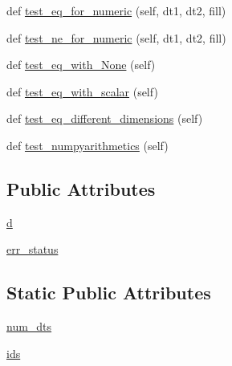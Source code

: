 \begin{DoxyCompactItemize}
\item 
def \hyperlink{classnumpy_1_1ma_1_1tests_1_1test__core_1_1TestMaskedArrayArithmetic_a850656e5b9b1ed7d491aa6cd62f332ad}{test\+\_\+eq\+\_\+for\+\_\+numeric} (self, dt1, dt2, fill)
\item 
def \hyperlink{classnumpy_1_1ma_1_1tests_1_1test__core_1_1TestMaskedArrayArithmetic_ad1511e126123782727d56780737859d2}{test\+\_\+ne\+\_\+for\+\_\+numeric} (self, dt1, dt2, fill)
\item 
def \hyperlink{classnumpy_1_1ma_1_1tests_1_1test__core_1_1TestMaskedArrayArithmetic_ab750537b060ed11b7270ede92b8f1d03}{test\+\_\+eq\+\_\+with\+\_\+\+None} (self)
\item 
def \hyperlink{classnumpy_1_1ma_1_1tests_1_1test__core_1_1TestMaskedArrayArithmetic_a2badcd153cb655e986bd8cdabe076cc4}{test\+\_\+eq\+\_\+with\+\_\+scalar} (self)
\item 
def \hyperlink{classnumpy_1_1ma_1_1tests_1_1test__core_1_1TestMaskedArrayArithmetic_ac0c802b9df6146e8e40f694cd0c7d5a7}{test\+\_\+eq\+\_\+different\+\_\+dimensions} (self)
\item 
def \hyperlink{classnumpy_1_1ma_1_1tests_1_1test__core_1_1TestMaskedArrayArithmetic_abd4df7b3870e06d9579592fe5293282b}{test\+\_\+numpyarithmetics} (self)
\end{DoxyCompactItemize}
\subsection*{Public Attributes}
\begin{DoxyCompactItemize}
\item 
\hyperlink{classnumpy_1_1ma_1_1tests_1_1test__core_1_1TestMaskedArrayArithmetic_a9a75c9a68d820c60da00fca93251c47d}{d}
\item 
\hyperlink{classnumpy_1_1ma_1_1tests_1_1test__core_1_1TestMaskedArrayArithmetic_ab63735ad1a5b8319dfa644f17905e7da}{err\+\_\+status}
\end{DoxyCompactItemize}
\subsection*{Static Public Attributes}
\begin{DoxyCompactItemize}
\item 
\hyperlink{classnumpy_1_1ma_1_1tests_1_1test__core_1_1TestMaskedArrayArithmetic_af81e178c1332369d92045b33e9ba6e0c}{num\+\_\+dts}
\item 
\hyperlink{classnumpy_1_1ma_1_1tests_1_1test__core_1_1TestMaskedArrayArithmetic_aa2fa29c6023ec850a269cf5ee539824c}{ids}
\end{DoxyCompactItemize}


